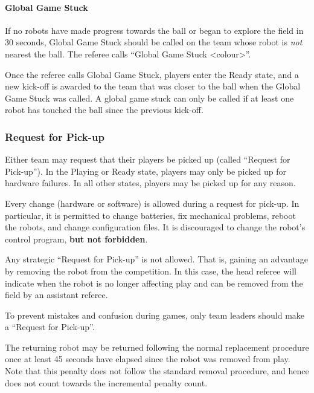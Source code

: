 \paragraph{Global Game Stuck}
\label{sec:game_stuck:global}

If no robots have made progress towards the ball or began to explore the field in 30 seconds, Global Game Stuck should be called on the team whose robot is \textit{not} nearest the ball.
The referee calls ``Global Game Stuck \textless colour\textgreater''.

Once the referee calls Global Game Stuck, players enter the Ready state, and a new kick-off is awarded to the team that was closer to the ball when the Global Game Stuck was called. A global game stuck can only be called if at least one robot has touched the ball since the previous kick-off.

\subsubsection{Request for Pick-up}
\label{sec:request_for_pickup}

Either team may request that their players be picked up (called ``Request for Pick-up''). In the Playing or Ready state, players may only be picked up for hardware failures. In all other states, players may be picked up for any reason.

Every change (hardware or software) is allowed during a request for pick-up. In particular, it is permitted to change batteries, fix mechanical problems, reboot the robots, and change configuration files. It is discouraged to change the robot's control program, \textbf{but not forbidden}. \\

Any strategic ``Request for Pick-up'' is not allowed. That is, gaining an advantage by removing the robot from the competition. In this case, the head referee will indicate when the robot is no longer affecting play and can be removed from the field by an assistant referee.

To prevent mistakes and confusion during games, only team leaders should make a ``Request for Pick-up''. 

The returning robot may be returned following the normal replacement procedure once at least 45 seconds have elapsed since the robot was removed from play. Note that this penalty does not follow the standard removal procedure, and hence does not count towards the incremental penalty count.

